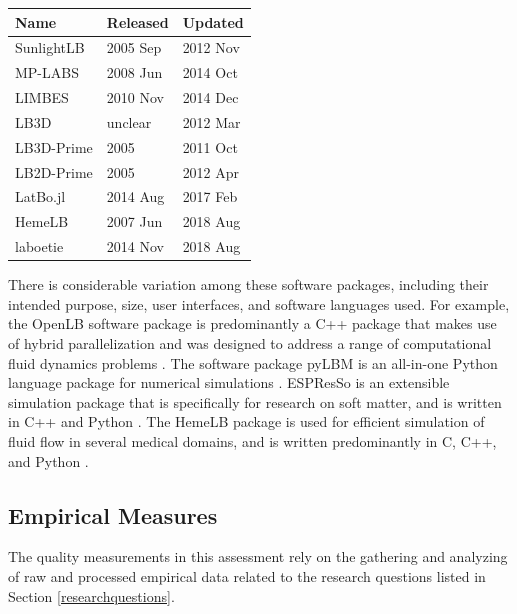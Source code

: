 \documentclass[12pt, notitlepage]{article}
\begin{document}
\begin{center}
	\begin{tabular}{ p{4cm}p{3cm}p{3cm} }
		\hline
		Name & Released & Updated\\
		\hline
		SunlightLB & 2005 Sep & 2012 Nov\\
		MP-LABS & 2008 Jun & 2014 Oct\\
		LIMBES & 2010 Nov & 2014 Dec\\
		LB3D & unclear & 2012 Mar\\
		LB3D-Prime & 2005 & 2011 Oct\\
		LB2D-Prime & 2005 & 2012 Apr\\
		LatBo.jl & 2014 Aug & 2017 Feb\\
		HemeLB & 2007 Jun & 2018 Aug\\
		laboetie & 2014 Nov & 2018 Aug\\
		\hline
	\end{tabular}
	\label{deadpackages}
\end{center}

There is considerable variation among these software packages, including their intended purpose, size, user interfaces, and software languages used. For example, the OpenLB software package is predominantly a C++ package that makes use of hybrid parallelization and was designed to address a range of computational fluid dynamics problems \citep{heuveline2009towards}. The software package pyLBM is an all-in-one Python language package for numerical simulations \citep{graille2017pylbm}. ESPResSo is an extensible simulation package that is specifically for research on soft matter, and is written in C++ and Python \citep{weik2019espresso}. The HemeLB package is used for efficient simulation of fluid flow in several medical domains, and is written predominantly in C, C++, and Python \citep{mazzeo2008hemelb}. 

\subsection{Empirical Measures}\label{empiricalmeasures}

The quality measurements in this assessment rely on the gathering and analyzing of raw and processed empirical data related to the research questions listed in Section \ref{researchquestions}. 
\end{document}
